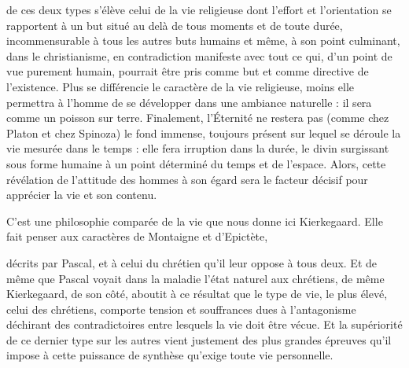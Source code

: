 \documentclass[12pt,a4paper]{article}
\begin{document}
de ces deux types s'élève celui de la vie religieuse dont
l'effort et l'orientation se rapportent à un but situé au delà de tous
moments et de toute durée, incommensurable à tous les autres buts
humains et même, à son point culminant, dans le christianisme,
en contradiction manifeste avec tout ce qui, d'un point de vue purement
humain, pourrait être pris comme but et comme directive
de l'existence. Plus se différencie le caractère de la vie religieuse,
moins elle permettra à l'homme de se développer dans une
ambiance naturelle : il sera comme un poisson sur terre. Finalement,
l'Éternité ne restera pas (comme chez Platon et chez Spinoza)
le fond immense, toujours présent sur lequel se déroule la vie
mesurée dans le temps : elle fera irruption dans la durée, le divin
surgissant sous forme humaine à un point déterminé du temps et
de l'espace. Alors, cette révélation de l'attitude des hommes à son
égard sera le facteur décisif pour apprécier la vie et son contenu.

C'est une philosophie comparée de la vie que nous donne ici
Kierkegaard. Elle fait penser aux caractères de Montaigne et d'Epictète,%

décrits par Pascal, et à celui du chrétien qu'il leur oppose à
tous deux. Et de même que Pascal voyait dans la maladie l'état
naturel aux chrétiens, de même Kierkegaard, de son côté, aboutit
à ce résultat que le type de vie, le plus élevé, celui des chrétiens,
comporte tension et souffrances dues à l'antagonisme déchirant des
contradictoires entre lesquels la vie doit être vécue. Et la supériorité
de ce dernier type sur les autres vient justement des plus
grandes épreuves qu'il impose à cette puissance de synthèse qu'exige
toute vie personnelle.
\end{document}
